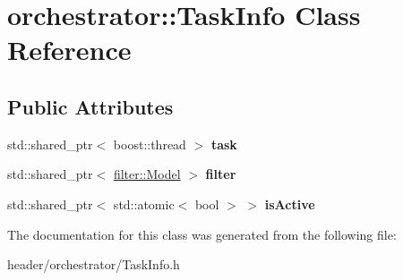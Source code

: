 \hypertarget{classorchestrator_1_1_task_info}{}\section{orchestrator\+:\+:Task\+Info Class Reference}
\label{classorchestrator_1_1_task_info}
\subsection*{Public Attributes}
\begin{DoxyCompactItemize}
\item 
\mbox{\label{classorchestrator_1_1_task_info_a1d00a69d6f0b3894310db097a0e2deee}} 
std\+::shared\+\_\+ptr$<$ boost\+::thread $>$ {\bfseries task}
\item 
\mbox{\label{classorchestrator_1_1_task_info_a6bc63174aed60a276e0aabedcc740f67}} 
std\+::shared\+\_\+ptr$<$ \hyperlink{classfilter_1_1_model}{filter\+::\+Model} $>$ {\bfseries filter}
\item 
\mbox{\label{classorchestrator_1_1_task_info_af4b659e236e21fc296fb841a4cfd09bc}} 
std\+::shared\+\_\+ptr$<$ std\+::atomic$<$ bool $>$ $>$ {\bfseries is\+Active}
\end{DoxyCompactItemize}


The documentation for this class was generated from the following file\+:\begin{DoxyCompactItemize}
\item 
header/orchestrator/Task\+Info.\+h\end{DoxyCompactItemize}
